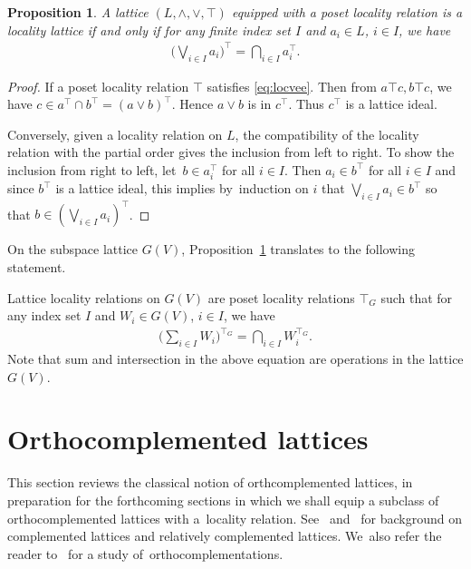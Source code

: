 \documentclass[pdftex]{sigma}
\numberwithin{equation}{section}
\newtheorem{Proposition}[Theorem]{Proposition}
\newcommand{\loc}{locality\xspace}
\begin{document}
\begin{Proposition}\label{prop:locvee} A lattice $(L, \wedge, \vee, \top)$ equipped with a poset \loc relation is a \loc lattice if and only if for any finite index set $I$ and $a_i\in L$, $i\in I$, we have
	\begin{gather}\label{eq:locvee}
	\bigg(\bigvee_{i\in I} a_i\bigg)^{\top } =\bigcap _{i\in I} a_i^{\top}.
	\end{gather}
\end{Proposition}
\begin{proof} If a poset locality relation $\top$ satisfies
		\eqref{eq:locvee}. Then from $a\top c, b\top c$, we have $c\in a^\top \cap b^\top = (a\vee b)^\top$. Hence $a\vee b$ is in $c^\top$. Thus $c^\top$ is a lattice ideal.
		
Conversely, given a \loc relation on $L$, the compatibility of the \loc relation with the partial order gives the inclusion from left to right. To show the inclusion from right to left, let~$b\in a_i^\top$ for all $i\in I$. Then $a_i\in b^\top$ for all $i\in I$ and since $b^\top$ is a lattice ideal, this implies by~induction on $i$ that $\bigvee_{i\in I} a_i \in b^\top$ so that $b\in 	 \left(\bigvee_{i\in I} a_i\right)^{\top }$.
\end{proof}

On the subspace lattice $G(V)$, Proposition~\ref{prop:locvee} translates to the following statement.
\begin{Example} %
		Lattice locality relations on $G(V)$ are poset locality relations $\top_G$ such that for any index set $I$ and $W_i\in G(V)$, $i\in I$, we have
	\begin{gather*}%
	\bigg(\sum_{i\in I} W_i\bigg)^{\top _G} =\bigcap_{i\in I} W_i^{\top _G}.
	\end{gather*}
	Note that sum and intersection in the above equation are operations in the lattice $G(V)$.
\end{Example}

\section{Orthocomplemented lattices}\label{sec:ortholatt}
This section reviews the classical notion of orthcomplemented lattices, in preparation for the forthcoming sections in which we shall equip a subclass of orthocomplemented lattices with a~\loc relation.
See~\cite[Section~II.6 ]{B} and~\cite[Section~I.6]{Gra1} for background on complemented lattices and relatively complemented lattices. We~also refer the reader to~\cite{CM} for a study of~ortho\-complementations.
\end{document}
